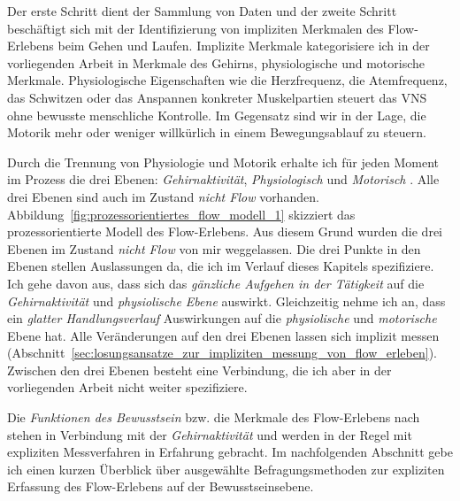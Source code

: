 Der erste Schritt dient der Sammlung von Daten und der zweite Schritt beschäftigt sich mit der Identifizierung von impliziten Merkmalen des Flow-Erlebens beim Gehen und Laufen. Implizite Merkmale kategorisiere ich in der vorliegenden Arbeit in Merkmale des Gehirns, physiologische und motorische Merkmale. Physiologische Eigenschaften wie die Herzfrequenz, die Atemfrequenz, das Schwitzen oder das Anspannen konkreter Muskelpartien steuert das \ac{VNS} ohne bewusste menschliche Kontrolle. Im Gegensatz sind wir in der Lage, die Motorik mehr oder weniger willkürlich in einem Bewegungsablauf zu steuern. 

Durch die Trennung von Physiologie und Motorik erhalte ich für jeden Moment im Prozess die drei Ebenen: \emph{Gehirnaktivität}, \emph{Physiologisch} und \emph{Motorisch} \citep[][S.~15]{Grueter2016a}. Alle drei Ebenen sind auch im Zustand \emph{nicht Flow} vorhanden. Abbildung~\ref{fig:prozessorientiertes_flow_modell_1} skizziert das prozessorientierte Modell des Flow-Erlebens. Aus diesem Grund wurden die drei Ebenen im Zustand \emph{nicht Flow} von mir weggelassen. Die drei Punkte in den Ebenen stellen Auslassungen da, die ich im Verlauf dieses Kapitels spezifiziere. Ich gehe davon aus, dass sich das \emph{gänzliche Aufgehen in der Tätigkeit} auf die \emph{Gehirnaktivität} und \emph{physiolische Ebene} auswirkt. Gleichzeitig nehme ich an, dass ein \emph{glatter Handlungsverlauf} Auswirkungen auf die \emph{physiolische} und \emph{motorische} Ebene hat. Alle Veränderungen auf den drei Ebenen lassen sich implizit messen (Abschnitt~\ref{sec:losungsansatze_zur_impliziten_messung_von_flow_erleben}). Zwischen den drei Ebenen besteht eine Verbindung, die ich aber in der vorliegenden Arbeit nicht weiter spezifiziere. 

Die \emph{Funktionen des Bewusstsein} bzw. die Merkmale des Flow-Erlebens nach \citet{Henk2014} stehen in Verbindung mit der \emph{Gehirnaktivität} und werden in der Regel mit expliziten Messverfahren in Erfahrung gebracht. Im nachfolgenden Abschnitt gebe ich einen kurzen Überblick über ausgewählte Befragungsmethoden zur expliziten Erfassung des Flow-Erlebens auf der Bewusstseinsebene. 

